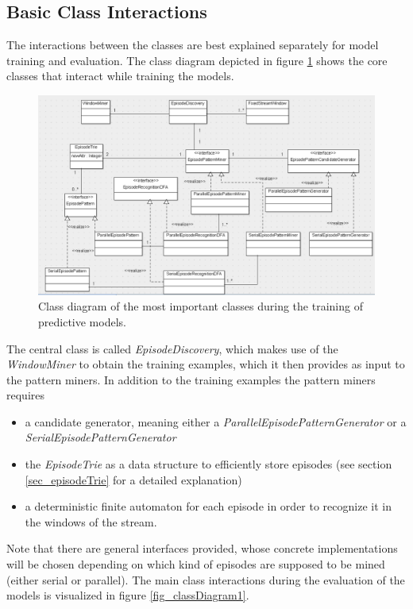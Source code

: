 \subsection{Basic Class Interactions}
The interactions between the classes are best explained separately for model training and evaluation. The class diagram depicted in figure \ref{fig_classDiagramTraining} shows the core classes that interact while training the models.

\begin{figure}[h]
	\centering
  	\includegraphics[width=\textwidth]{classDiagramTraining}
	\caption{Class diagram of the most important classes during the training of predictive models.}
	\label{fig_classDiagramTraining}
\end{figure}

The central class is called \textit{EpisodeDiscovery}, which makes use of the \textit{WindowMiner} to obtain the training examples, which it then provides as input to the pattern miners. In addition to the training examples the pattern miners requires

\begin{itemize}
	\item a candidate generator, meaning either a \textit{ParallelEpisodePatternGenerator} or a \textit{SerialEpisodePatternGenerator}
	\item the \textit{EpisodeTrie} as a data structure to efficiently store episodes (see section \ref{sec_episodeTrie} for a detailed explanation)
	\item a deterministic finite automaton for each episode in order to recognize it in the windows of the stream. 
\end{itemize}

Note that there are general interfaces provided, whose concrete implementations will be chosen depending on which kind of episodes are supposed to be mined (either serial or parallel). The main class interactions during the evaluation of the models is visualized in figure \ref{fig_classDiagram1}.

